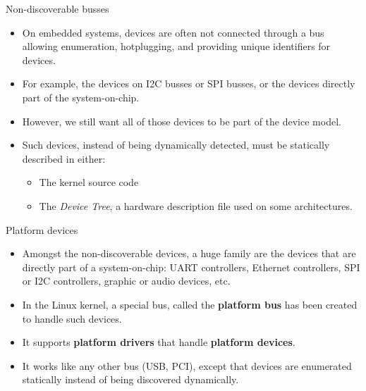 \begin{frame}{Non-discoverable busses}
  \begin{itemize}
  \item On embedded systems, devices are often not connected through a
    bus allowing enumeration, hotplugging, and providing unique
    identifiers for devices.
  \item For example, the devices on I2C busses or SPI busses, or the
    devices directly part of the system-on-chip.
  \item However, we still want all of those devices to be part of the
    device model.
  \item Such devices, instead of being dynamically detected, must be
    statically described in either:
    \begin{itemize}
    \item The kernel source code
    \item The {\em Device Tree}, a hardware description file used on
      some architectures.
    \end{itemize}
  \end{itemize}
\end{frame}

\begin{frame}{Platform devices}
  \begin{itemize}
  \item Amongst the non-discoverable devices, a huge family are the
    devices that are directly part of a system-on-chip: UART
    controllers, Ethernet controllers, SPI or I2C controllers, graphic
    or audio devices, etc.
  \item In the Linux kernel, a special bus, called the {\bf platform
      bus} has been created to handle such devices.
  \item It supports {\bf platform drivers} that handle {\bf platform
      devices}.
  \item It works like any other bus (USB, PCI), except that devices
    are enumerated statically instead of being discovered dynamically.
  \end{itemize}
\end{frame}

